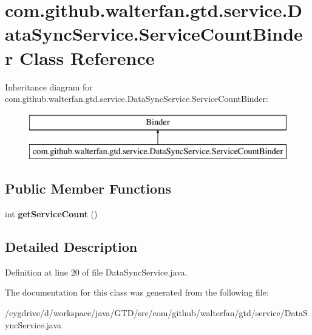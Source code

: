 \hypertarget{classcom_1_1github_1_1walterfan_1_1gtd_1_1service_1_1DataSyncService_1_1ServiceCountBinder}{\section{com.\-github.\-walterfan.\-gtd.\-service.\-Data\-Sync\-Service.\-Service\-Count\-Binder Class Reference}
\label{classcom_1_1github_1_1walterfan_1_1gtd_1_1service_1_1DataSyncService_1_1ServiceCountBinder}
}
Inheritance diagram for com.\-github.\-walterfan.\-gtd.\-service.\-Data\-Sync\-Service.\-Service\-Count\-Binder\-:\begin{figure}[H]
\begin{center}
\leavevmode
\includegraphics[height=2.000000cm]{classcom_1_1github_1_1walterfan_1_1gtd_1_1service_1_1DataSyncService_1_1ServiceCountBinder}
\end{center}
\end{figure}
\subsection*{Public Member Functions}
\begin{DoxyCompactItemize}
\item 
\hypertarget{classcom_1_1github_1_1walterfan_1_1gtd_1_1service_1_1DataSyncService_1_1ServiceCountBinder_ae6e403b042ad5b1783f8f3c5ad08df2c}{int {\bfseries get\-Service\-Count} ()}\label{classcom_1_1github_1_1walterfan_1_1gtd_1_1service_1_1DataSyncService_1_1ServiceCountBinder_ae6e403b042ad5b1783f8f3c5ad08df2c}

\end{DoxyCompactItemize}


\subsection{Detailed Description}


Definition at line 20 of file Data\-Sync\-Service.\-java.



The documentation for this class was generated from the following file\-:\begin{DoxyCompactItemize}
\item 
/cygdrive/d/workspace/java/\-G\-T\-D/src/com/github/walterfan/gtd/service/Data\-Sync\-Service.\-java\end{DoxyCompactItemize}
